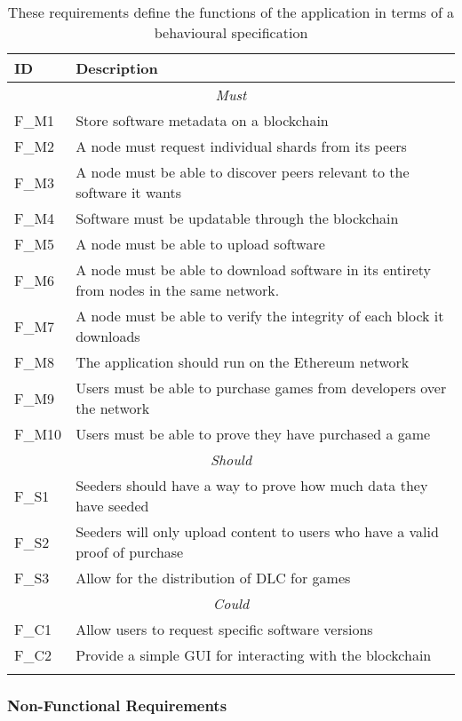 \begin{longtable}{ p{} p{} }
  \toprule
  \textbf{ID} & \textbf{Description}
  \\\midrule\midrule
  \multicolumn{2}{c}{\cellcolor{red!70}\textit{Must}}\\\midrule
  F\_M1 & Store software metadata on a blockchain\\
  F\_M2 & A node must request individual shards from its peers\\
  F\_M3 & A node must be able to discover peers relevant to the software it wants\\
  F\_M4 & Software must be updatable through the blockchain\\
  F\_M5 & A node must be able to upload software\\
  F\_M6 & A node must be able to download software in its entirety from nodes in the same network.\\
  F\_M7 & A node must be able to verify the integrity of each block it downloads\\
  F\_M8 & The application should run on the Ethereum network\\
  F\_M9 & Users must be able to purchase games from developers over the network\\
  F\_M10 & Users must be able to prove they have purchased a game\\
  \midrule\multicolumn{2}{c}{\cellcolor{orange!70}\textit{Should}}\\\midrule
  F\_S1 & Seeders should have a way to prove how much data they have seeded\\
  F\_S2 & Seeders will only upload content to users who have a valid proof of purchase\\
  F\_S3 & Allow for the distribution of DLC for games\\
  \midrule\multicolumn{2}{c}{\cellcolor{green}\textit{Could}}\\\midrule
  F\_C1 & Allow users to request specific software versions\\
  F\_C2 & Provide a simple GUI for interacting with the blockchain\\
  \midrule
  \bottomrule
  \caption{These requirements define the functions of the application in terms of a behavioural specification }
  \label{tab:functional-requirements}
\end{longtable}

\subsubsection*{Non-Functional Requirements}

